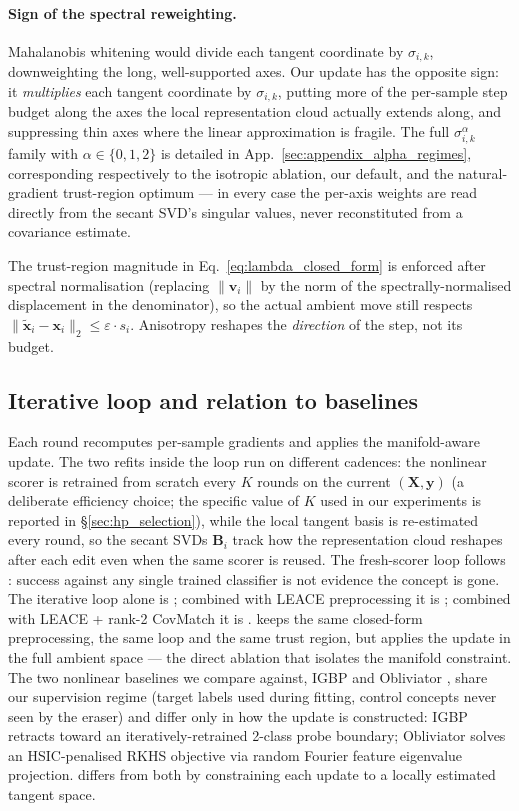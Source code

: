 \paragraph{Sign of the spectral reweighting.}
Mahalanobis whitening would divide each tangent coordinate by $\sigma_{i,k}$, downweighting the long, well-supported axes. Our update has the opposite sign: it \emph{multiplies} each tangent coordinate by $\sigma_{i,k}$, putting more of the per-sample step budget along the axes the local representation cloud actually extends along, and suppressing thin axes where the linear approximation is fragile. The full $\sigma_{i,k}^{\alpha}$ family with $\alpha \in \{0, 1, 2\}$ is detailed in App.~\ref{sec:appendix_alpha_regimes}, corresponding respectively to the isotropic ablation, our default, and the natural-gradient trust-region optimum --- in every case the per-axis weights are read directly from the secant SVD's singular values, never reconstituted from a covariance estimate.

The trust-region magnitude in Eq.~\ref{eq:lambda_closed_form} is enforced after spectral normalisation (replacing $\|\mathbf{v}_i\|$ by the norm of the spectrally-normalised displacement in the denominator), so the actual ambient move still respects $\| \tilde{\mathbf{x}}_i - \mathbf{x}_i \|_2 \le \varepsilon \cdot s_i$. Anisotropy reshapes the \emph{direction} of the step, not its budget.

\subsection{Iterative loop and relation to baselines}

Each round recomputes per-sample gradients and applies the manifold-aware update. The two refits inside the loop run on different cadences: the nonlinear scorer is retrained from scratch every $K$ rounds on the current $(\mathbf{X}, \mathbf{y})$ (a deliberate efficiency choice; the specific value of $K$ used in our experiments is reported in §\ref{sec:hp_selection}), while the local tangent basis is re-estimated every round, so the secant SVDs $\mathbf{B}_i$ track how the representation cloud reshapes after each edit even when the same scorer is reused. The fresh-scorer loop follows \citet{elazar-goldberg-2018-adversarial}: success against any single trained classifier is not evidence the concept is gone. The iterative loop alone is \TanGCE{}; combined with LEACE preprocessing it is \TanGCEp{}; combined with LEACE + rank-2 CovMatch it is \TanGCEpp{}. \AmbGCEpp{} keeps the same closed-form preprocessing, the same loop and the same trust region, but applies the update in the full ambient space --- the direct ablation that isolates the manifold constraint. The two nonlinear baselines we compare against, IGBP \citep{iskander-etal-2023-shielded} and Obliviator \citep{akbari-etal-2025-obliviator}, share our supervision regime (target labels used during fitting, control concepts never seen by the eraser) and differ only in how the update is constructed: IGBP retracts toward an iteratively-retrained 2-class probe boundary; Obliviator solves an HSIC-penalised RKHS objective via random Fourier feature eigenvalue projection. \TanGCE{} differs from both by constraining each update to a locally estimated tangent space.
